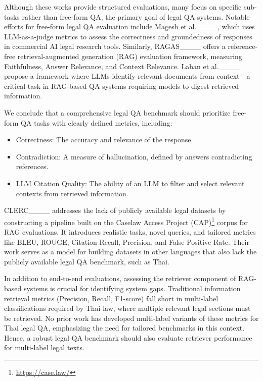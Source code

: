 Although these works provide structured evaluations, many focus on specific sub-tasks rather than free-form QA, the primary goal of legal QA systems. 
%
Notable efforts for free-form legal QA evaluation include Magesh et al.____, which uses LLM-as-a-judge metrics to assess the correctness and groundedness of responses in commercial AI legal research tools. 
%
Similarly, RAGAS____ offers a reference-free retrieval-augmented generation (RAG) evaluation framework, measuring Faithfulness, Answer Relevance, and Context Relevance. 
%
Laban et al.____ propose a framework where LLMs identify relevant documents from context—a critical task in RAG-based QA systems requiring models to digest retrieved information.

We conclude that a comprehensive legal QA benchmark should prioritize free-form QA tasks with clearly defined metrics, including:

\begin{itemize}
    \item{Correctness: The accuracy and relevance of the response.}
    \item{Contradiction: A measure of hallucination, defined by answers contradicting references.}
    \item{LLM Citation Quality: The ability of an LLM to filter and select relevant contexts from retrieved information.}
\end{itemize}

CLERC____ addresses the lack of publicly available legal datasets by constructing a pipeline built on the Caselaw Access Project (CAP)\footnote{\url{https://case.law/}} corpus for RAG evaluations. 
%
It introduces realistic tasks, novel queries, and tailored metrics like BLEU, ROUGE, Citation Recall, Precision, and False Positive Rate.
%
Their work serves as a model for building datasets in other languages that also lack the publicly available legal QA benchmark, such as Thai.

In addition to end-to-end evaluations, assessing the retriever component of RAG-based systems is crucial for identifying system gaps. 
%
Traditional information retrieval metrics (Precision, Recall, F1-score) fall short in multi-label classifications required by Thai law, where multiple relevant legal sections must be retrieved. 
%
No prior work has developed multi-label variants of these metrics for Thai legal QA, emphasizing the need for tailored benchmarks in this context. 
%
Hence, a robust legal QA benchmark should also evaluate retriever performance for multi-label legal texts.

